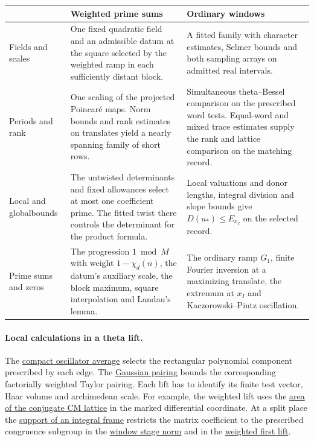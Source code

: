 \documentclass[11pt,a4paper]{article}
\begin{document}
\begin{center}
\small
\renewcommand{\arraystretch}{1.22}
\begin{tabularx}{\linewidth}{@{}>{\raggedright\arraybackslash}p{.16\linewidth}
  *{2}{>{\raggedright\arraybackslash}X}@{}}
\toprule
 & \textbf{Weighted prime sums} & \textbf{Ordinary windows} \\
\midrule
Fields and scales &
One fixed quadratic field and an admissible datum at the square
selected by the weighted ramp in each sufficiently distant block. &
A fitted family with character estimates, Selmer bounds and both
sampling arrays on admitted real intervals. \\
Periods and rank &
One scaling of the projected Poincar\'e maps. Norm bounds and rank
estimates on translates yield a nearly spanning family of short rows. &
Simultaneous theta--Bessel comparison on the prescribed word tests.
Equal-word and mixed trace estimates supply the rank and lattice
comparison on the matching record. \\
Local and global\newline bounds &
The untwisted determinants and fixed allowances select at most one
coefficient prime. The fitted twist there controls the determinant
for the product formula. &
Local valuations and donor lengths, integral division and slope
bounds give \(D(u_*)\le E_{x_I}\) on the selected record. \\
Prime sums and zeros &
The progression \(1\bmod M\) with weight \(1-\chi_d(n)\), the datum's
auxiliary scale, the block maximum, square interpolation and Landau's lemma. &
The ordinary ramp \(G_1\), finite Fourier inversion at a maximizing
translate, the extremum at \(x_I\) and Kaczorowski--Pintz oscillation. \\
\bottomrule
\end{tabularx}
\end{center}

\paragraph{Local calculations in a theta lift.}
The \hyperlink{proof.compact-rectangular-average}{compact oscillator average}
selects the rectangular polynomial component prescribed by each edge.
The \hyperlink{proof.shared-gaussian-jet-pairing}{Gaussian pairing}
bounds the corresponding factorially weighted Taylor pairing. Each lift has to
identify its finite test vector, Haar volume and archimedean scale.
For example, the weighted lift uses the
\hyperlink{proof.weighted-cm-area-mean}{area of the conjugate CM lattice}
in the marked differential coordinate. At a split place the
\hyperlink{proof.split-primitive-support}{support of an integral frame}
restricts the matrix coefficient to the prescribed congruence subgroup
in the \hyperlink{proof.stage-petersson}{window stage norm} and in
the \hyperlink{proof.weighted-triangle-point-kernel}{weighted first lift}.
\end{document}
